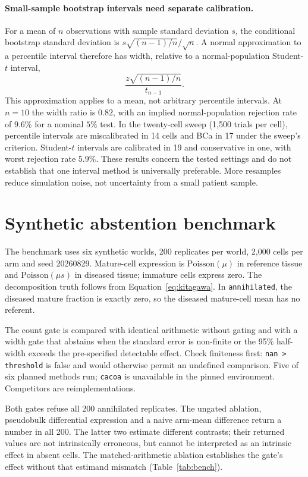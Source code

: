\paragraph{Small-sample bootstrap intervals need separate calibration.}
For a mean of $n$ observations with sample standard deviation $s$, the
conditional bootstrap standard deviation is $s\sqrt{(n-1)/n}/\sqrt n$.
A normal approximation to a percentile interval therefore has width, relative
to a normal-population Student-$t$ interval,
\[
\frac{z\sqrt{(n-1)/n}}{t_{n-1}}.
\]
This approximation applies to a mean, not arbitrary percentile intervals.
At $n=10$ the width ratio is $0.82$, with an implied normal-population
rejection rate of $9.6\%$ for a nominal $5\%$ test. In the twenty-cell
sweep (1{,}500 trials per cell), percentile intervals are miscalibrated in 14
cells and BCa in 17 under the sweep's criterion. Student-$t$ intervals are
calibrated in 19 and conservative in one, with worst rejection rate $5.9\%$.
These results concern the tested settings and do not establish that one
interval method is universally preferable. More resamples reduce simulation
noise, not uncertainty from a small patient sample.

\section{Synthetic abstention benchmark}
\label{app:bench}
\label{app:benchtable}

The benchmark uses six synthetic worlds, 200 replicates per world, 2{,}000
cells per arm and seed 20260829. Mature-cell expression is
$\mathrm{Poisson}(\mu)$ in reference tissue and $\mathrm{Poisson}(\mu s)$ in
diseased tissue; immature cells express zero. The decomposition truth follows
from Equation~\ref{eq:kitagawa}. In \texttt{annihilated}, the diseased mature
fraction is exactly zero, so the diseased mature-cell mean has no referent.

The count gate is compared with identical arithmetic without gating and with
a width gate that abstains when the standard error is non-finite or the 95\%
half-width exceeds the pre-specified detectable effect. Check finiteness first:
\texttt{nan > threshold} is false and would otherwise permit an undefined
comparison. Five of six planned methods run; \texttt{cacoa} is unavailable in the pinned
environment. Competitors are reimplementations.

Both gates refuse all 200 annihilated replicates. The ungated ablation,
pseudobulk differential expression and a naive arm-mean difference return a
number in all 200. The latter two estimate different contrasts; their returned
values are not intrinsically erroneous, but cannot be interpreted as an
intrinsic effect in absent cells. The matched-arithmetic ablation establishes
the gate's effect without that estimand mismatch (Table~\ref{tab:bench}).


